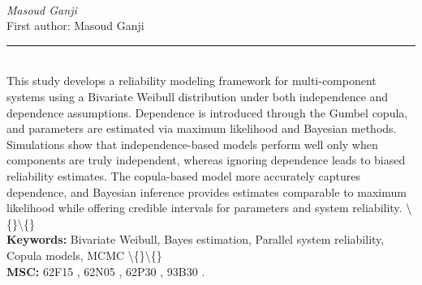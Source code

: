 \documentclass[10pt,twoside]{article}
\begin{document}
\noindent\begin{minipage}[t][\textheight]{\textwidth}
\\[0.35em]
{\itshape Masoud Ganji}\\[0.2em]
{\footnotesize First author: Masoud Ganji}\\[0.45em]
\noindent\rule{\textwidth}{0.3pt}\\[0.4em]
{\footnotesize  This study develops a reliability modeling framework for multi-component systems using a Bivariate Weibull distribution under both independence and dependence assumptions. Dependence is introduced through the Gumbel copula, and parameters are estimated via maximum likelihood and Bayesian methods. Simulations show that independence-based models perform well only when components are truly independent, whereas ignoring dependence leads to biased reliability estimates. The copula-based model more accurately captures dependence, and Bayesian inference provides estimates comparable to maximum likelihood while offering credible intervals for parameters and system reliability. \textbackslash\{\}\textbackslash\{\}}\\[0.4em]
{\footnotesize\bfseries Keywords:} {\footnotesize Bivariate Weibull, Bayes estimation, Parallel system reliability, Copula models, MCMC \textbackslash\{\}\textbackslash\{\}}\\[0.15em]
{\footnotesize\bfseries MSC:} {\footnotesize 62F15 , 62N05 , 62P30 , 93B30 .}\\
\vfill
\end{minipage}
\newpage
\end{document}
